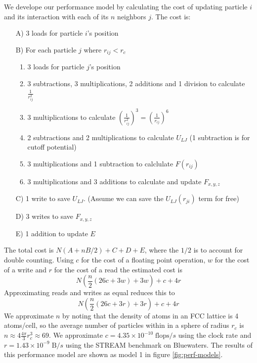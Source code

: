 \documentclass[12pt]{article}
\begin{document}
We develope our performance model by calculating the cost of updating
particle $i$ and its interaction with each of its $n$ neighbors
$j$. The cost is:
\begin{itemize}
\item[A)] 3 loads for particle $i$'s position
\item[B)] For each particle $j$ where $r_{ij}<r_c$
  \begin{enumerate}
    \item $3$ loads for particle $j$'s position
    \item 3 subtractions, 3 multiplications, 2 additions and 1 division to calculate $\frac{1}{r_{ij}^2}$ 
    \item 3 multiplications to calculate $\left(\frac{1}{r_{ij}^2}\right)^3=\left(\frac{1}{r_{ij}}\right)^6$
    \item 2 subtractions and 2 multiplications to calculate $U_{LJ}$ (1 subtraction is for cutoff potential)
    \item 3 multiplications and 1 subtraction to calclulate $F(r_{ij})$
    \item 3 multiplications and 3 additions to calculate and update $F_{x,y,z}$
  \end{enumerate}
\item[C)] 1 write to save $U_{LJ}$. (Assume we can save the $U_{LJ}(r_{ji})$ term for free)
\item[D)] 3 writes to save $F_{x,y,z}$
\item[E)] 1 addition to update $E$
\end{itemize}
The total cost is $N(A+nB/2)+C+D+E$, where the $1/2$ is to account for
double counting. Using $c$ for the cost of a floating point operation,
$w$ for the cost of a write and $r$ for the cost of a read the
estimated cost is
\begin{equation}
N \left(\frac{n}{2} \left(26 c + 3 w\right) + 3 w\right) + c + 4 r
\end{equation}
Approximating reads and writes as equal reduces this to
\begin{equation}
  N \left(\frac{n}{2} \left(26 c + 3 r\right) + 3 r\right) + c + 4 r
  \label{eqn:perf-model}
\end{equation}
We approximate $n$ by noting that the density of atoms in an FCC
lattice is 4 atoms/cell, so the average number of particles within in
a sphere of radius $r_c$ is $n \approx 4\frac{4\pi}{3}r_c^3\approx69$.
We approximate $c=4.35\times10^{-10}\;\text{flops}/s$ using the clock
rate and $r=1.43\times10^{-9}\;\text{B}/s$ using the STREAM benchmark
on Bluewaters. The results of this performance model are shown as
model 1 in figure \ref{fig:perf-models}.
\end{document}
